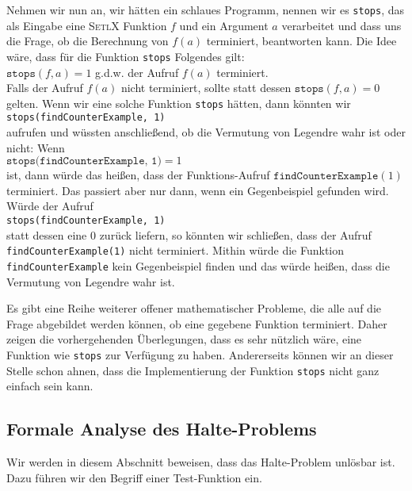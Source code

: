 Nehmen wir nun an, wir h\"{a}tten ein schlaues Programm, nennen wir es \texttt{stops}, das als Eingabe
eine \textsc{SetlX} Funktion $f$ und ein Argument $a$ verarbeitet und dass uns die Frage, ob die Berechnung von $f(a)$
terminiert, beantworten kann.  Die Idee w\"{a}re, dass für die Funktion \texttt{stops} Folgendes gilt:
\\[0.2cm]
\hspace*{1.3cm}
$\texttt{stops}(f, a) = 1$ \quad g.d.w. \quad der Aufruf $f(a)$ terminiert.
\\[0.2cm]
Falls der Aufruf $f(a)$ nicht terminiert,  sollte statt dessen $\texttt{stops}(f,a) = 0$ gelten.
Wenn wir eine solche Funktion \texttt{stops} h\"{a}tten, dann k\"{o}nnten wir 
\\[0.2cm]
\hspace*{1.3cm}
\texttt{stops(findCounterExample, 1)}
\\[0.2cm]
aufrufen und w\"{u}ssten anschlie\ss{}end, ob die Vermutung von Legendre wahr ist oder nicht:  Wenn
\\[0.2cm]
\hspace*{1.3cm}
$\texttt{stops(findCounterExample, 1)} = 1$
 \\[0.2cm]
ist, dann w\"{u}rde das hei\ss{}en,
dass der Funktions-Aufruf $\texttt{findCounterExample}(1)$ terminiert.  Das passiert aber nur dann,
wenn ein Gegenbeispiel gefunden wird.  W\"{u}rde der Aufruf 
\\[0.2cm]
\hspace*{1.3cm}
\texttt{stops(findCounterExample, 1)}
\\[0.2cm]
statt dessen eine $0$ zur\"{u}ck liefern, so k\"{o}nnten wir schlie\ss{}en, dass der Aufruf \texttt{findCounterExample(1)}
nicht terminiert. Mithin w\"{u}rde die Funktion \texttt{findCounterExample} kein Gegenbeispiel finden und
das w\"{u}rde hei\ss{}en, dass die Vermutung von Legendre wahr ist.

Es gibt eine Reihe weiterer offener  mathematischer Probleme, die alle auf die Frage abgebildet
werden k\"{o}nnen, ob eine gegebene Funktion terminiert.  Daher zeigen die vorhergehenden \"{U}berlegungen,
dass es sehr n\"{u}tzlich w\"{a}re, eine Funktion wie \texttt{stops} zur Verf\"{u}gung zu haben.  Andererseits
k\"{o}nnen wir an dieser Stelle schon ahnen, dass die Implementierung der Funktion \texttt{stops}
nicht ganz einfach sein kann.  

 
\subsection{Formale Analyse des Halte-Problems}
Wir werden in diesem Abschnitt beweisen, dass das Halte-Problem unl\"{o}sbar ist.  Dazu f\"{u}hren
wir den Begriff einer Test-Funktion ein.  

